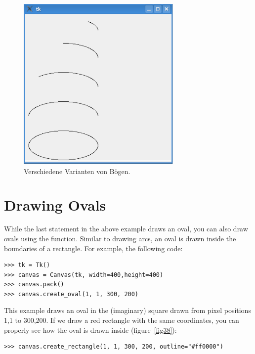 \begin{figure}
\begin{center}
\includegraphics[width=80mm]{images/figure37}
\end{center}
\caption{Verschiedene Varianten von Bögen.}\label{fig37}
\end{figure}

\section{Drawing Ovals}

While the last statement in the above example draws an oval, you can also draw ovals using the  function.  Similar to drawing arcs, an oval is drawn inside the boundaries of a rectangle. For example, the following code:

\begin{Verbatim}[frame=single]
>>> tk = Tk()
>>> canvas = Canvas(tk, width=400,height=400)
>>> canvas.pack()
>>> canvas.create_oval(1, 1, 300, 200)
\end{Verbatim}

This example draws an oval in the (imaginary) square drawn from pixel positions 1,1 to 300,200. If we draw a red rectangle with the same coordinates, you can properly see how the oval is drawn inside (figure~\ref{fig38}):

\begin{Verbatim}[frame=single]
>>> canvas.create_rectangle(1, 1, 300, 200, outline="#ff0000")
\end{Verbatim}

